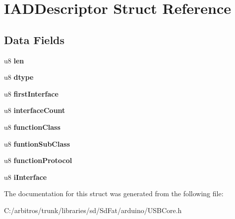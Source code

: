 \hypertarget{struct_i_a_d_descriptor}{\section{I\-A\-D\-Descriptor Struct Reference}
\label{struct_i_a_d_descriptor}
}
\subsection*{Data Fields}
\begin{DoxyCompactItemize}
\item 
\hypertarget{struct_i_a_d_descriptor_afbf3f3230446569534d5f466aaf4c23b}{u8 {\bfseries len}}\label{struct_i_a_d_descriptor_afbf3f3230446569534d5f466aaf4c23b}

\item 
\hypertarget{struct_i_a_d_descriptor_a0bb419531ec75697e63e9109fecf81b0}{u8 {\bfseries dtype}}\label{struct_i_a_d_descriptor_a0bb419531ec75697e63e9109fecf81b0}

\item 
\hypertarget{struct_i_a_d_descriptor_a1f310829bc6b0452ca7a433306711834}{u8 {\bfseries first\-Interface}}\label{struct_i_a_d_descriptor_a1f310829bc6b0452ca7a433306711834}

\item 
\hypertarget{struct_i_a_d_descriptor_ace4364c3a11490d83a57929409bab191}{u8 {\bfseries interface\-Count}}\label{struct_i_a_d_descriptor_ace4364c3a11490d83a57929409bab191}

\item 
\hypertarget{struct_i_a_d_descriptor_acf3f3dd7456fc16e020aff6bbe0f9573}{u8 {\bfseries function\-Class}}\label{struct_i_a_d_descriptor_acf3f3dd7456fc16e020aff6bbe0f9573}

\item 
\hypertarget{struct_i_a_d_descriptor_a6e072e7ab27ae52a925d022757a6abd1}{u8 {\bfseries funtion\-Sub\-Class}}\label{struct_i_a_d_descriptor_a6e072e7ab27ae52a925d022757a6abd1}

\item 
\hypertarget{struct_i_a_d_descriptor_a451c6c7831d9e3e3898951c5d036081f}{u8 {\bfseries function\-Protocol}}\label{struct_i_a_d_descriptor_a451c6c7831d9e3e3898951c5d036081f}

\item 
\hypertarget{struct_i_a_d_descriptor_a08ba0e1160648c2e45d24d1f00484466}{u8 {\bfseries i\-Interface}}\label{struct_i_a_d_descriptor_a08ba0e1160648c2e45d24d1f00484466}

\end{DoxyCompactItemize}


The documentation for this struct was generated from the following file\-:\begin{DoxyCompactItemize}
\item 
C\-:/arbitros/trunk/libraries/sd/\-Sd\-Fat/arduino/U\-S\-B\-Core.\-h\end{DoxyCompactItemize}
